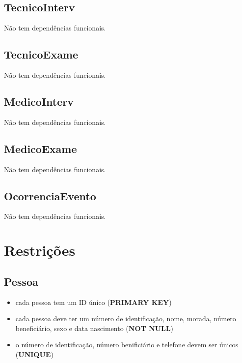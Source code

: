 \documentclass[article, a4paper, 12pt, oneside]{memoir}
\begin{document}
\section*{TecnicoInterv}
Não tem dependências funcionais.

\section*{TecnicoExame}
Não tem dependências funcionais.

\section*{MedicoInterv}
Não tem dependências funcionais.

\section*{MedicoExame}
Não tem dependências funcionais.

\section*{OcorrenciaEvento}
Não tem dependências funcionais.

\newpage
\chapter[Restrições][Restrições]{Restrições} \label{\thechapter}

\section*{Pessoa}
\begin{itemize}
	\item cada pessoa tem um ID único (\textbf{PRIMARY KEY})
	\item cada pessoa deve ter um número de identificação, nome, morada, número beneficiário, sexo e data nascimento (\textbf{NOT NULL})
	\item o número de identificação, número benificiário e telefone devem ser únicos (\textbf{UNIQUE})
\end{itemize}
\end{document}
